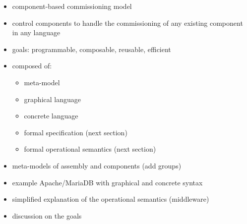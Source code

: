 \begin{itemize}
\item component-based commissioning model
\item control components to handle the commissioning of any existing
  component in any language
\item goals: programmable, composable, reusable, efficient
\item composed of:
  \begin{itemize}
  \item meta-model
  \item graphical language
  \item concrete language
  \item formal specification (next section)
  \item formal operational semantics (next section)
  \end{itemize}
\item meta-models of assembly and components (add groups)
\item example Apache/MariaDB with graphical and concrete syntax
\item simplified explanation of the operational semantics (middleware)
\item discussion on the goals
\end{itemize}
